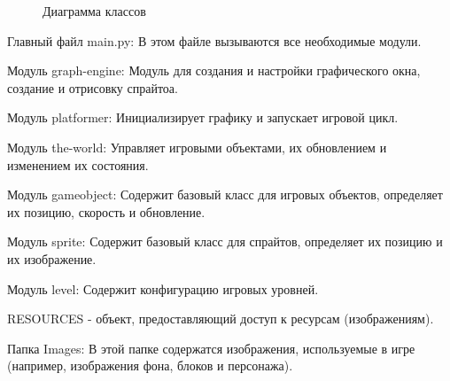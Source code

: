 \begin{figure}[H]
	\caption{Диаграмма классов}
	\label{UMLMontezuma:image}
\end{figure}

Главный файл main.py: В этом файле вызываются все необходимые модули.

Модуль graph-engine: Модуль для создания и настройки графического окна, создание и отрисовку спрайтоа.

Модуль platformer: Инициализирует графику и запускает игровой цикл.

Модуль the-world: Управляет игровыми объектами, их обновлением и изменением их состояния.

Модуль gameobject: Содержит базовый класс для игровых объектов, определяет их позицию, скорость и обновление.

Модуль sprite: Содержит базовый класс для спрайтов, определяет их позицию и их изображение.

Модуль level: Содержит конфигурацию игровых уровней. 

RESOURCES - объект, предоставляющий доступ к ресурсам (изображениям).

Папка Images: В этой папке содержатся изображения, используемые в игре (например, изображения фона, блоков и персонажа).